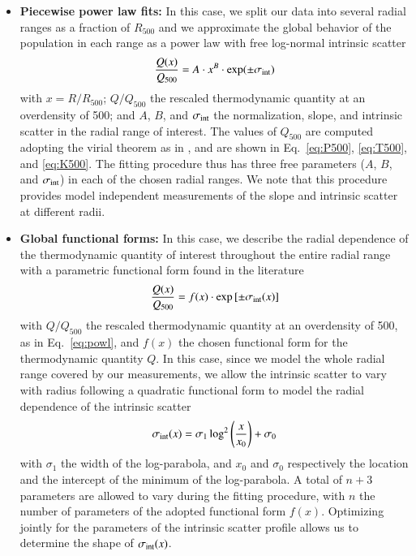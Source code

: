 \documentclass[traditabstract   ]{aa} %
\begin{document}
\begin{itemize}
\item \textbf{Piecewise power law fits: } In this case, we split our data into several radial ranges as a fraction of $R_{500}$ and we approximate the global behavior of the population in each range as a power law with free log-normal intrinsic scatter
\begin{equation}
\frac{Q(x)}{Q_{500}} = A \cdot  x^B \cdot \exp(\pm \sigma_{\rm int})
\label{eq:powl}
\end{equation}
with $x = R/R_{500}$; $Q/Q_{500}$ the rescaled thermodynamic quantity at an overdensity of 500; and $A$, $B$, and $\sigma_{\rm int}$ the normalization, slope, and intrinsic scatter in the radial range of interest. The values of $Q_{500}$ are computed adopting the virial theorem as in \cite{voit+05}, and are shown in Eq.~\eqref{eq:P500}, \eqref{eq:T500}, and \eqref{eq:K500}. The fitting procedure thus has three free parameters ($A$, $B$, and $\sigma_{\rm int}$) in each of the chosen radial ranges. We note that this procedure provides model independent measurements of the slope and intrinsic scatter at different radii. 

\item \textbf{Global functional forms:} In this case, we describe the radial dependence of the thermodynamic quantity of interest throughout the entire radial range with a parametric functional form found in the literature
\begin{equation}
\frac{Q(x)}{Q_{500}} = f(x) \cdot \exp\left[\pm \sigma_{\rm int} (x)\right]
\label{eq:general}
\end{equation}
with $Q/Q_{500}$ the rescaled thermodynamic quantity at
an overdensity of 500, as in Eq.~\eqref{eq:powl}, and $f(x)$ the chosen functional form for the thermodynamic quantity $Q$. In this case, since we model the whole radial range covered by our measurements, we allow the intrinsic scatter to vary with radius following a quadratic functional form to model the radial dependence of the intrinsic scatter
\begin{equation}
\sigma_{\rm int} (x) = \sigma_1  \log^2 \left( \frac{x}{x_0} \right) + \sigma_0
\label{eq:sigma_int_x}
\end{equation}
with $\sigma_1$ the width of the log-parabola, and $x_0$ and $\sigma_0$  respectively the location and the intercept of the minimum of the log-parabola. A total of $n+3$ parameters are allowed to vary during the fitting procedure, with $n$ the number of parameters of the adopted functional form $f(x)$. Optimizing jointly for the parameters of the intrinsic scatter profile allows us to determine the shape of $\sigma_{\rm int}(x)$.

\end{itemize}
\end{document}
